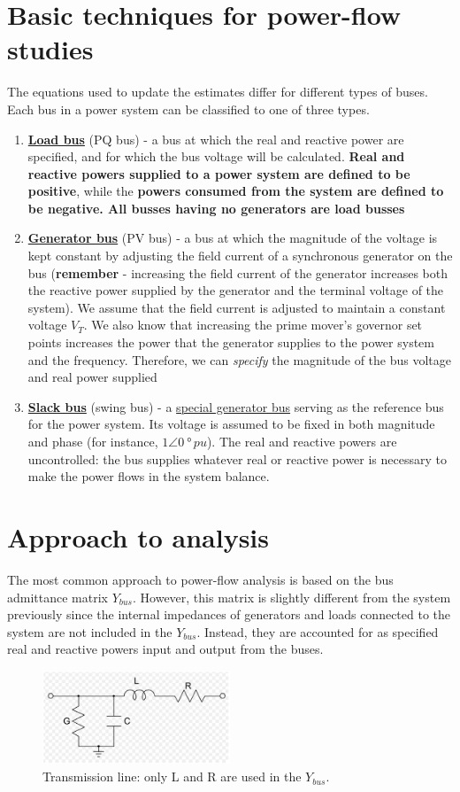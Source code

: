 \section{Basic techniques for power-flow studies}
The equations used to update the estimates differ for different types of buses. Each bus in a power system can be classified to one of three types.
\begin{enumerate}
	\item \textbf{\underline{Load bus}} (PQ bus) - a bus at which the real and reactive power are specified, and for which the bus voltage will be calculated. \textbf{Real and reactive powers supplied to a power system are defined to be positive}, while the \textbf{powers consumed from the system are defined to be negative. All busses having no generators are load busses}
	\item \textbf{\underline{Generator bus}} (PV bus) - a bus at which the magnitude of the voltage is kept constant by adjusting the field current of a synchronous generator on the bus (\textbf{remember} - increasing the field current of the generator increases both the reactive power supplied by the generator and the terminal voltage of the system). We assume that the field current is adjusted to maintain a constant voltage $V_T$. We also know that increasing the prime mover's governor set points increases the power that the generator supplies to the power system and the frequency. Therefore, we can \textit{specify} the magnitude of the bus voltage and real power supplied
	\item \textbf{\underline{Slack bus}} (swing bus) - a \underline{special generator bus} serving as the reference bus for the power system. Its voltage is assumed to be fixed in both magnitude and phase (for instance, $1\angle\SI{0}{\degree}\, \si{pu}$). The real and reactive powers are uncontrolled: the bus supplies whatever real or reactive power is necessary to make the power flows in the system balance.
\end{enumerate}
\section{Approach to analysis}
The most common approach to power-flow analysis is based on the bus admittance matrix $Y_{bus}$. However, this matrix is slightly different from the system previously since the internal impedances of generators and loads connected to the system are not included in the $Y_{bus}$. Instead, they are accounted for as specified real and reactive powers input and output from the buses.
\begin{figure}[H]
	\centering
	\includegraphics[width = 0.5\textwidth]{./img/figure49.png}
	\caption{Transmission line: only L and R are used in the $Y_{bus}$.}
\end{figure}

